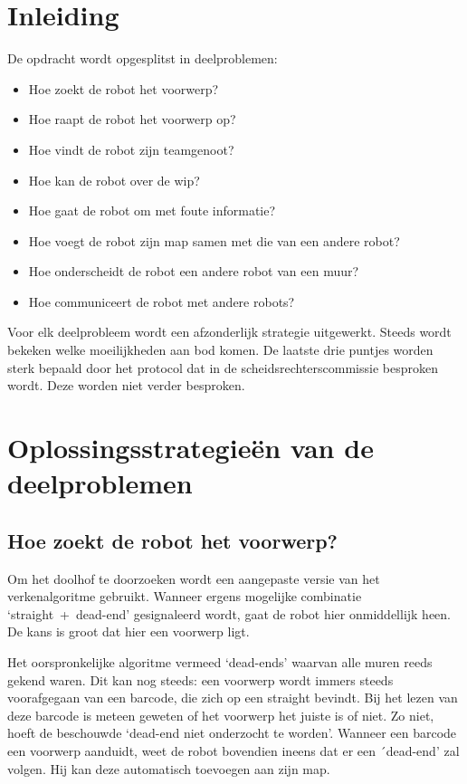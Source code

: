 \documentclass{peno}
\begin{document}
\maketitle

\section{Inleiding}

De opdracht wordt opgesplitst in deelproblemen:

\begin{itemize}
\item Hoe zoekt de robot het voorwerp?
\item Hoe raapt de robot het voorwerp op?
\item Hoe vindt de robot zijn teamgenoot?
\item Hoe kan de robot over de wip?
\item Hoe gaat de robot om met foute informatie?
\item Hoe voegt de robot zijn map samen met die van een andere robot?
\item Hoe onderscheidt de robot een andere robot van een muur?
\item Hoe communiceert de robot met andere robots?
\end{itemize}

Voor elk deelprobleem wordt een afzonderlijk strategie uitgewerkt. Steeds wordt bekeken welke moeilijkheden aan bod komen. De laatste drie puntjes worden sterk bepaald door het protocol dat in de scheidsrechterscommissie besproken wordt. Deze worden niet verder besproken.\\

\section{Oplossingsstrategie\"en van de deelproblemen}
\subsection*{Hoe zoekt de robot het voorwerp?}

Om het doolhof te doorzoeken wordt een aangepaste versie van het verkenalgoritme gebruikt. Wanneer ergens mogelijke combinatie `straight~+~dead-end' gesignaleerd wordt, gaat de robot hier onmiddellijk heen. De kans is groot dat hier een voorwerp ligt.

Het oorspronkelijke algoritme vermeed `dead-ends' waarvan alle muren reeds gekend waren. Dit kan nog steeds: een voorwerp wordt immers steeds voorafgegaan van een barcode, die zich op een straight bevindt. Bij het lezen van deze barcode is meteen geweten of het voorwerp het juiste is of niet. Zo niet, hoeft de beschouwde `dead-end niet onderzocht te worden'. Wanneer een barcode een voorwerp aanduidt, weet de robot bovendien ineens dat er een ´dead-end' zal volgen. Hij kan deze automatisch toevoegen aan zijn map.
\end{document}
